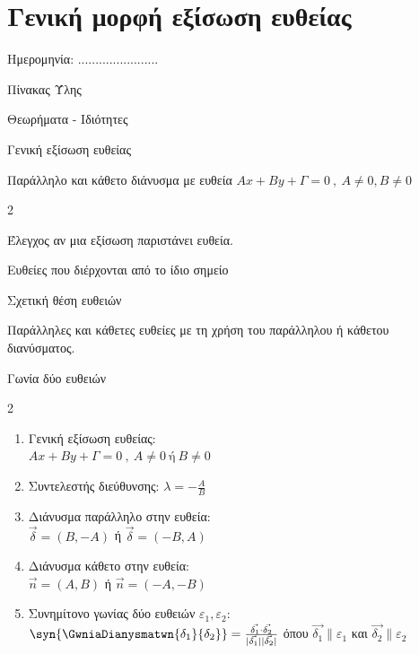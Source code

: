\documentclass[twoside,nofonts,internet,math,spyros]{frontisthrio}
\newcommand{\myitem}{\stepcounter{enumi}\item[\raisebox{0.5mm}{\faEdit}\ \Large$\square$]}
\begin{document}
\section{Γενική μορφή εξίσωση ευθείας}
\begin{flushright}
\faCalendar* Ημερομηνία: .......................
\end{flushright}
\begin{mybox}[mysubtitle]{Πίνακας Ύλης}
\begin{tcbraster}[raster columns=1,raster equal height]
\begin{myleftbox}{Θεωρήματα - Ιδιότητες\ \ \faTools}
\begin{arithmisi}[itemsep=0mm]
\item Γενική εξίσωση ευθείας
\item Παράλληλο και κάθετο διάνυσμα με ευθεία $Ax+By+\varGamma=0\ ,\ A\neq 0,B\neq 0$
\end{arithmisi}
\end{myleftbox}
\end{tcbraster}
\begin{multicols}{2}
\begin{todolist}[itemsep=0mm]
\myitem Έλεγχος αν μια εξίσωση παριστάνει ευθεία.
\item Ευθείες που διέρχονται από το ίδιο σημείο
\item Σχετική θέση ευθειών
\myitem Παράλληλες και κάθετες ευθείες με τη χρήση του παράλληλου ή κάθετου διανύσματος.
\myitem Γωνία δύο ευθειών
\end{todolist}
\end{multicols}
\begin{multicols}{2}
\begin{enumerate}[itemsep=0mm,leftmargin=5mm]
\item Γενική εξίσωση ευθείας:\\$Ax+By+\varGamma=0\ ,\ A\neq 0\ \textrm{ή}\ B\neq 0$
\item Συντελεστής διεύθυνσης:  $\lambda=-\frac{A}{B}$
\item Διάνυσμα παράλληλο στην ευθεία:\\ $\vec{\delta}=(B,-A) $ ή $\vec{\delta}=(-B,A) $
\item Διάνυσμα κάθετο στην ευθεία:\\$\vec{n}=(A,B)$ ή $\vec{n}=(-A,-B)$
\item Συνημίτονο γωνίας δύο ευθειών $\varepsilon_1,\varepsilon_2 $:\\$\syn{\GwniaDianysmatwn{\delta_1}{\delta_2}}=\frac{\vec{\delta_1}\cdot \vec{\delta_2}}{|\vec{\delta_1}||\vec{\delta_2}|}$ όπου $\vec{\delta_1}\parallel\varepsilon_1$ και $\vec{\delta_2}\parallel\varepsilon_2$
\end{enumerate}
\end{multicols}
\end{mybox}
\end{document}
